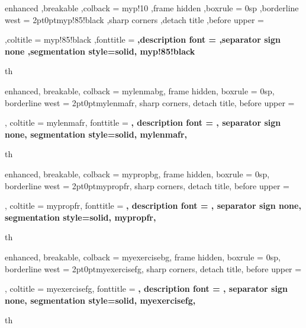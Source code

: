 {%
	enhanced
	,breakable
	,colback = myp!10
	,frame hidden
	,boxrule = 0sp
	,borderline west = {2pt}{0pt}{myp!85!black}
	,sharp corners
	,detach title
	,before upper = \tcbtitle\par\smallskip
	,coltitle = myp!85!black
	,fonttitle = \bfseries\sffamily
	,description font = \mdseries
	,separator sign none
	,segmentation style={solid, myp!85!black}
}
{th}


{%
	enhanced,
	breakable,
	colback = mylenmabg,
	frame hidden,
	boxrule = 0sp,
	borderline west = {2pt}{0pt}{mylenmafr},
	sharp corners,
	detach title,
	before upper = \tcbtitle\par\smallskip,
	coltitle = mylenmafr,
	fonttitle = \bfseries\sffamily,
	description font = \mdseries,
	separator sign none,
	segmentation style={solid, mylenmafr},
}
{th}



{%
	enhanced,
	breakable,
	colback = mypropbg,
	frame hidden,
	boxrule = 0sp,
	borderline west = {2pt}{0pt}{mypropfr},
	sharp corners,
	detach title,
	before upper = \tcbtitle\par\smallskip,
	coltitle = mypropfr,
	fonttitle = \bfseries\sffamily,
	description font = \mdseries,
	separator sign none,
	segmentation style={solid, mypropfr},
}
{th}


{%
	enhanced,
	breakable,
	colback = myexercisebg,
	frame hidden,
	boxrule = 0sp,
	borderline west = {2pt}{0pt}{myexercisefg},
	sharp corners,
	detach title,
	before upper = \tcbtitle\par\smallskip,
	coltitle = myexercisefg,
	fonttitle = \bfseries\sffamily,
	description font = \mdseries,
	separator sign none,
	segmentation style={solid, myexercisefg},
}
{th}


